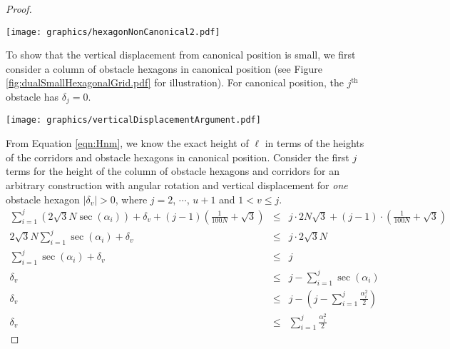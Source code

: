 \documentclass[10pt]{CSUNthesis}
\theoremstyle{plain}%
\theoremstyle{definition}
\theoremstyle{remark}
\newcommand{\jth}{j^\text{th}}
\newcommand{\lr}[1]{\left( #1 \right)}
\begin{document}
\begin{proof}
\begin{minipage}{\linewidth}
\begin{center}
\texttt{[image: graphics/hexagonNonCanonical2.pdf]}
\label{fig:hexagonNonCanonical.pdf}
\end{center}
\end{minipage}

To show that the vertical displacement from canonical position is small, we first consider a column of obstacle hexagons in canonical position (see Figure \ref{fig:dualSmallHexagonalGrid.pdf} for illustration).  
For canonical position, the $\jth$ obstacle has $\delta_j = 0$.

\begin{minipage}{\linewidth}
\begin{center}
\texttt{[image: graphics/verticalDisplacementArgument.pdf]}
\label{fig:verticalDisplacementArgument.pdf}
\end{center}
\end{minipage}

From Equation \ref{eqn:Hnm}, we know the exact height of $\ell$ in terms of the heights of the corridors and obstacle hexagons in canonical position.  
Consider the first $j$ terms for the height of the column of obstacle hexagons and corridors for an arbitrary construction with angular rotation and vertical displacement for \textit{one} obstacle hexagon $\vert \delta_v \vert > 0$, where $j=2$, $\cdots$, $u+1$ and $1 < v \leq j$.
\begin{eqnarray*}
\sum_{i=1}^j \lr{2 \sqrt{3} N \sec \lr{ \alpha_i}} + \delta_v  + (j-1) \lr{\frac{1}{100N}+\sqrt{3}} &\leq& j \cdot 2 N \sqrt{3} + (j-1) \cdot \lr{\frac{1}{100N}+\sqrt{3}}\\
2 \sqrt{3} N \sum_{i=1}^j \sec \lr{\alpha_i} + \delta_ v &\leq& j \cdot 2 \sqrt{3} N \\
\sum_{i=1}^j \sec \lr{\alpha_i} + \delta_v &\leq& j\\
 \delta_v &\leq& j- \sum_{i=1}^j \sec \lr{\alpha_i}\\
 \delta_v &\leq& j - \lr{j - \sum_{i=1}^j \frac{\alpha_i^2}{2}}\\
\delta_v &\leq&  \sum_{i=1}^j \frac{\alpha_i^2}{2}
\end{eqnarray*}


\end{proof}
\end{document}

